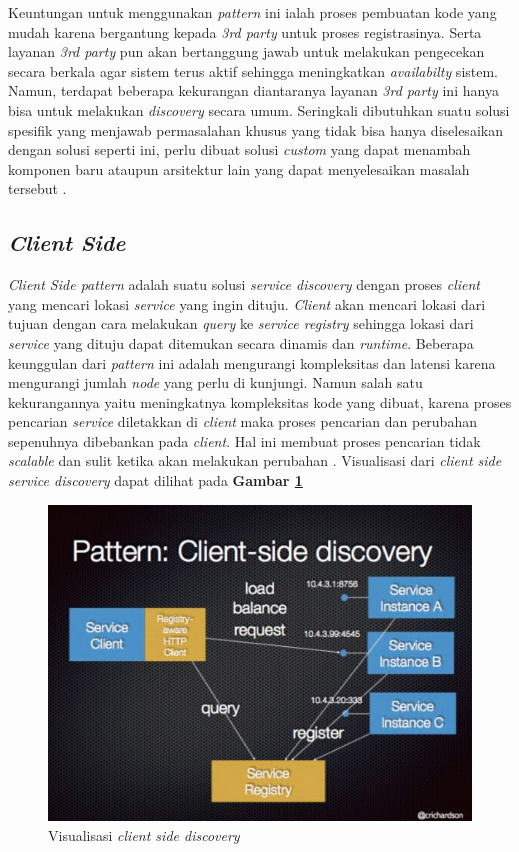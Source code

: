 Keuntungan untuk menggunakan \textit{pattern} ini ialah proses pembuatan kode yang mudah karena bergantung kepada \textit{3rd party} untuk proses registrasinya. Serta layanan \textit{3rd party} pun akan bertanggung jawab untuk melakukan pengecekan secara berkala agar sistem terus aktif sehingga meningkatkan \textit{availabilty} sistem. Namun, terdapat beberapa kekurangan diantaranya layanan \textit{3rd party} ini hanya bisa untuk melakukan \textit{discovery} secara umum. Seringkali dibutuhkan suatu solusi spesifik yang menjawab permasalahan khusus yang tidak bisa hanya diselesaikan dengan solusi seperti ini, perlu dibuat solusi \textit{custom} yang dapat menambah komponen baru ataupun arsitektur lain yang dapat menyelesaikan masalah tersebut \parencite{3rdpartyintegration}.

\subsection{\textit{Client Side}}
\textit{Client Side pattern} adalah suatu solusi \textit{service discovery} dengan proses \textit{client} yang mencari lokasi \textit{service} yang ingin dituju. \textit{Client} akan mencari lokasi dari tujuan dengan cara melakukan \textit{query} ke \textit{service registry} sehingga lokasi dari \textit{service} yang dituju dapat ditemukan secara dinamis dan \textit{runtime}. Beberapa keunggulan dari \textit{pattern} ini adalah mengurangi kompleksitas dan latensi karena mengurangi jumlah \textit{node} yang perlu di kunjungi. Namun salah satu kekurangannya yaitu meningkatnya kompleksitas kode yang dibuat, karena proses pencarian \textit{service} diletakkan di \textit{client} maka proses pencarian dan perubahan sepenuhnya dibebankan pada \textit{client}. Hal ini membuat proses pencarian tidak \textit{scalable} dan sulit ketika akan melakukan perubahan \parencite{clientsidediscovery}. Visualisasi dari \textit{client side service discovery} dapat dilihat pada \textbf{Gambar \ref{fig:client-side-discovery}}

\begin{figure}[ht]
  \centering
  \includegraphics[width=1\textwidth]{resources/chapter-2/client-side-discovery.jpg}
  \caption{Visualisasi \textit{client side discovery} \parencite{clientsidediscovery} }
  \label{fig:client-side-discovery}
\end{figure}

